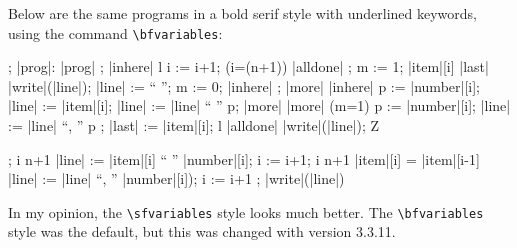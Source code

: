 \documentclass{article}
\begin{document}
Below are the same programs in a bold serif style with underlined keywords, using the command
\verb:\bfvariables::
\bfvariables
\begin{program}
 \VAR {}; 
 \ACTIONS |prog|: 
|prog| \ACTIONEQ %
    ;
    \CALL |inhere| \ENDACTION
l \ACTIONEQ %
    i := i+1; 
    \IF (i=(n+1)) \THEN \CALL |alldone| \FI ; 
    m := 1; 
    \IF |item|[i] \neq |last|
	\THEN |write|(|line|); |line| := `` ''; m := 0;
	      \CALL |inhere| \FI ; 
    \CALL |more| \ENDACTION
|inhere| \ACTIONEQ %
    p := |number|[i]; |line| := |item|[i];
    |line| := |line| \concat `` '' \concat p;
    \CALL |more| \ENDACTION
|more| \ACTIONEQ %
    \IF (m=1) \THEN p := |number|[i];
    |line| := |line| \concat ``, '' \concat p \FI ; 
    |last| := |item|[i]; 
    \CALL l  \ENDACTION  
|alldone| \ACTIONEQ |write|(|line|); \CALL Z \ENDACTION \ENDACTIONS \END 
\end{program} 

\begin{program}
; 
\WHILE i \neq n+1 \DO 
  |line| := |item|[i] \concat `` '' \concat |number|[i]; 
  i := i+1; 
  \WHILE i \neq n+1 \AND |item|[i] = |item|[i-1] \DO 
    |line| := |line| \concat ``, '' \concat |number|[i]);
    i := i+1 \OD ; 
  |write|(|line|) \OD 
\end{program}

In my opinion, the \verb:\sfvariables: style looks much better.
The \verb:\bfvariables: style was the default, but this was changed with version 3.3.11.
\end{document}
